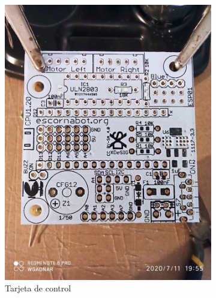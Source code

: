 \documentclass{article}
\begin{document}
\begin{figure}[H]
    \centering
    \begin{subfigure}[t]{0.3\textwidth}
        \centering
        \includegraphics[width=0.9\columnwidth, height=1.2\columnwidth]{images/CPU/cpu_inicial.jpg}
        \caption{Tarjeta de control}
        \label{fig:cpu_inicial}
    \end{subfigure}%
    \begin{subfigure}[t]{0.3\textwidth}
        \centering

\end{subfigure}
\end{figure}
\end{document}
